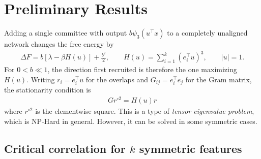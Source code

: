 \documentclass[midterm]{sparreport}
\theoremstyle{definition}
\begin{document}
\section{Preliminary Results}

Adding a single committee with output $b\psi_3(u^\top x)$ to a completely unaligned network changes the free energy by
\begin{align*}
    \Delta F
    = b\left[\lambda - \beta H(u)\right] + \frac{b^2}{2},
    \qquad
    H(u) = \sum_{i=1}^k (e_i^\top u)^3,
    \qquad |u| = 1.
\end{align*}
For $0 < b \ll 1$, the direction first recruited is therefore the one maximizing $H(u)$.
Writing $r_i = e_i^\top u$ for the overlaps and $G_{ij} = e_i^\top e_j$ for the Gram matrix, the stationarity condition is
\begin{align*}
    \boxed{G r^{\circ 2} = H(u) r}
\end{align*}
where $r^{\circ 2}$ is the elementwise square.
This is a type of \emph{tensor eigenvalue problem}, which is NP-Hard in general.
However, it can be solved in some symmetric cases.

\subsection{Critical correlation for $k$ symmetric features}
\end{document}
